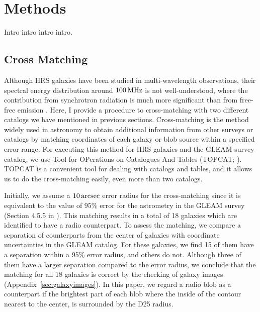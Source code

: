 \chapter{Methods}
\begin{chapabstract}

Intro intro intro intro.

\end{chapabstract}

\section{Cross Matching}\label{sec:crossmatching}
Although HRS galaxies have been studied in multi-wavelength observations, their spectral energy distribution around $100\,\mathrm{MHz}$ is not well-understood, where the contribution from synchrotron radiation is much more significant than from free-free emission \citep{Condon1992a}.
Here, I provide a procedure to cross-matching with two different catalogs we have mentioned in previous sections.
Cross-matching is the method widely used in astronomy to obtain additional information from other surveys or catalogs by matching coordinates of each galaxy or blob source within a specified error range.
For executing this method for HRS galaxies and the GLEAM survey catalog, we use Tool for OPerations on Catalogues And Tables (TOPCAT\@; \citealt{Taylor2009}).
TOPCAT is a convenient tool for dealing with catalogs and tables, and it allows us to do the cross-matching easily, even more than two catalogs.

Initially, we assume a $10\,\mathrm{arcsec}$ error radius for the cross-matching since it is equivalent to the value of $95\%$ error for the astrometry in the GLEAM survey (Section 4.5.5 in \citealt{Hurley-Walker2017a}).
This matching results in a total of 18 galaxies which are identified to have a radio counterpart.
To assess the matching, we compare a separation of counterparts from the center of galaxies with coordinate uncertainties in the GLEAM catalog.
For these galaxies, we find 15 of them have a separation within a 95\% error radius, and others do not.
Although three of them have a larger separation compared to the error radius, we conclude that the matching for all 18 galaxies is correct by the checking of galaxy images (Appendix~\ref{sec:galaxyimages}).
In this paper, we regard a radio blob as a counterpart if the brightest part of each blob where the inside of the contour nearest to the center, is surrounded by the D25 radius.

